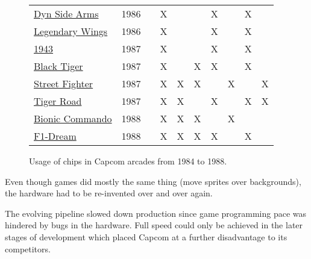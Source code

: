 \begin{figure}[H]
{\begin{tabularx}{\textwidth}{Xccccccccc}
\href{https://www.youtube.com/watch?v=0QyLx94PMio}{Dyn Side Arms}
                & 1986          &               &      X       &              &              &       X       &               &       X       &               \\
\href{https://www.youtube.com/watch?v=0f4jWQyf-fs}{Legendary Wings}
                & 1986          &               &      X       &              &              &       X       &               &       X       &               \\
  \toprule    
\href{https://www.youtube.com/watch?v=kntCwchJWfw}{1943}
                & 1987          &               &      X       &              &              &       X       &               &       X       &               \\
\href{https://www.youtube.com/watch?v=ZzKStmMAiHM}{Black Tiger}
                & 1987          &               &      X       &              &      X       &       X       &               &       X       &               \\
\href{https://www.youtube.com/watch?v=kVLCv-YgWco}{Street Fighter}
                & 1987          &               &      X       &      X       &      X       &               &       X       &               &       X       \\
\href{https://www.youtube.com/watch?v=1ZtwOGN-ZeE}{Tiger Road}
                & 1987          &               &      X       &      X       &              &       X       &               &       X       &       X       \\
  \toprule    
\href{https://www.youtube.com/watch?v=zG620nr7vko}{Bionic Commando}
                & 1988          &               &      X       &      X       &      X       &               &       X       &               &               \\
\href{https://www.youtube.com/watch?v=zG620nr7vko}{F1-Dream}
                & 1988          &               &      X       &      X       &      X       &       X       &               &       X       &               \\
  \toprule    
\end{tabularx}%
}\caption*{Usage of chips in Capcom arcades from 1984 to 1988\cite{cps0chipslist}.}
\label{fig:capcom_pcbs}
\end{figure}


Even though games did mostly the same thing (move sprites over backgrounds), the hardware had to be re-invented over and over again. 

The evolving pipeline slowed down production since game programming pace was hindered by bugs in the hardware. Full speed could only be achieved in the later stages of development which placed Capcom at a further disadvantage to its competitors.





